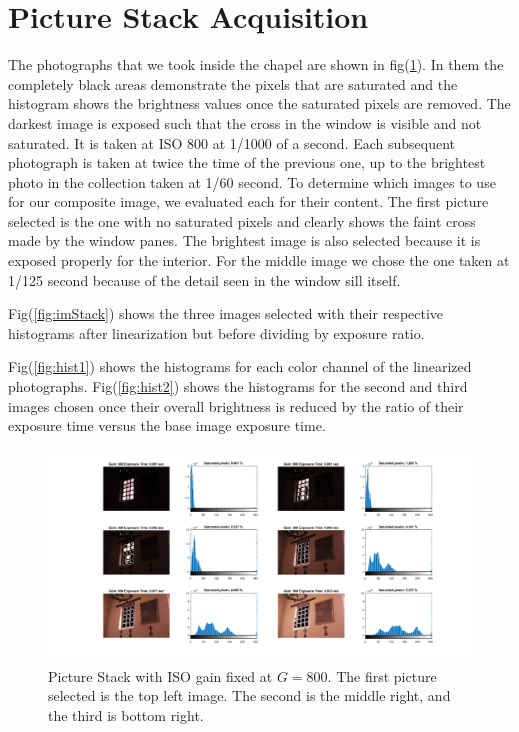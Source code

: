 \documentclass[a4paper]{article}
\begin{document}
\section{Picture Stack Acquisition}
The photographs that we took inside the chapel are shown in fig(\ref{fig:stack}). In them the completely black areas demonstrate the pixels that are saturated and the histogram shows the brightness values once the saturated pixels are removed.  The darkest image is exposed such that the cross in the window is visible and not saturated.  It is taken at ISO 800 at 1/1000 of a second.  Each subsequent photograph is taken at twice the time of the previous one, up to the brightest photo in the collection taken at 1/60 second. To determine which images to use for our composite image, we evaluated each for their content.  The first picture selected is the one with no saturated pixels and clearly shows the faint cross made by the window panes.  The brightest image is also selected because it is exposed properly for the interior.  For the middle image we chose the one taken at 1/125 second because of the detail seen in the window sill itself. 

Fig(\ref{fig:imStack}) shows the three images selected with their respective histograms after linearization but before dividing by exposure ratio.

Fig(\ref{fig:hist1}) shows the  histograms for each color channel of the linearized photographs.  Fig(\ref{fig:hist2}) shows the histograms for the second and third images chosen once their overall brightness is reduced by the ratio of their exposure time versus the base image exposure time. 

\begin{figure}[H]
\includegraphics[trim=7cm 1cm 1cm 0cm clip, scale=.4]{Chapel_Histogram_set.png}
\caption{Picture Stack with ISO gain fixed at $G = 800$.  The first picture selected is the top left image.  The second is the middle right, and the third is bottom right.}
\label{fig:stack}
\end{figure}
\end{document}
